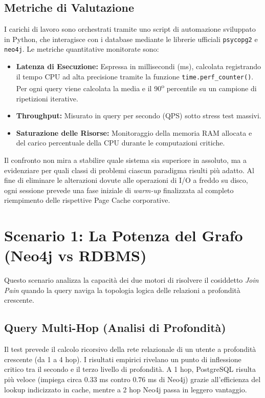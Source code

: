 \subsection{Metriche di Valutazione}
I carichi di lavoro sono orchestrati tramite uno script di automazione sviluppato in Python, che interagisce con i database mediante le librerie ufficiali \texttt{psycopg2} e \texttt{neo4j}. Le metriche quantitative monitorate sono:
\begin{itemize}
  \item \textbf{Latenza di Esecuzione:} Espressa in millisecondi (ms), calcolata registrando il tempo CPU ad alta precisione tramite la funzione \texttt{time.perf\_counter()}. Per ogni query viene calcolata la media e il 90\textsuperscript{o} percentile su un campione di ripetizioni iterative.
  \item \textbf{Throughput:} Misurato in query per secondo (QPS) sotto stress test massivi.
  \item \textbf{Saturazione delle Risorse:} Monitoraggio della memoria RAM allocata e del carico percentuale della CPU durante le computazioni critiche.
\end{itemize}

Il confronto non mira a stabilire quale sistema sia superiore in assoluto, ma a evidenziare per quali classi di problemi ciascun paradigma risulti più adatto. Al fine di eliminare le alterazioni dovute alle operazioni di I/O a freddo su disco, ogni sessione prevede una fase iniziale di \textit{warm-up} finalizzata al completo riempimento delle rispettive Page Cache corporative.

\section{Scenario 1: La Potenza del Grafo (Neo4j vs RDBMS)}
\label{sec:scenario1}
Questo scenario analizza la capacità dei due motori di risolvere il cosiddetto \textit{Join Pain} quando la query naviga la topologia logica delle relazioni a profondità crescente.

\subsection{Query Multi-Hop (Analisi di Profondità)}
Il test prevede il calcolo ricorsivo della rete relazionale di un utente a profondità crescente (da 1 a 4 hop).
I risultati empirici rivelano un punto di inflessione critico tra il secondo e il terzo livello di profondità. A 1 hop, PostgreSQL risulta più veloce (impiega circa $0.33$ ms contro $0.76$ ms di Neo4j) grazie all'efficienza del lookup indicizzato in cache, mentre a 2 hop Neo4j passa in leggero vantaggio.

